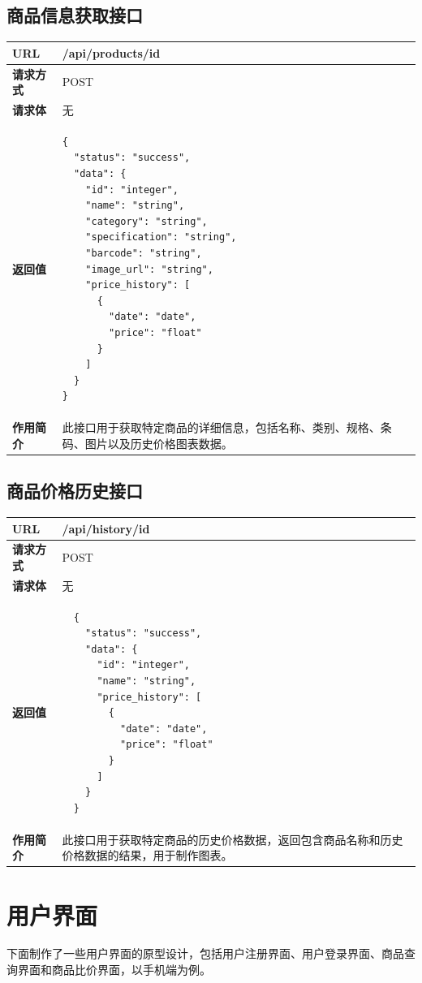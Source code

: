 \documentclass[12pt]{article}
\begin{document}
\subsection{商品信息获取接口}
\begin{longtable}{|p{3cm}|p{10cm}|}
\hline
\textbf{URL} & /api/products/{id} \\ \hline
\textbf{请求方式} & POST \\ \hline
\textbf{请求体} & 无 \\ \hline
\textbf{返回值} &
\begin{verbatim}
{
  "status": "success",
  "data": {
    "id": "integer",
    "name": "string",
    "category": "string",
    "specification": "string",
    "barcode": "string",
    "image_url": "string",
    "price_history": [
      {
        "date": "date",
        "price": "float"
      }
    ]
  }
}
\end{verbatim} \\ \hline
\textbf{作用简介} & 此接口用于获取特定商品的详细信息，包括名称、类别、规格、条码、图片以及历史价格图表数据。 \\ \hline
\end{longtable}

\subsection{商品价格历史接口}
\begin{longtable}{|p{3cm}|p{10cm}|}
  \hline
  \textbf{URL} & /api/history/{id} \\ \hline
  \textbf{请求方式} & POST \\ \hline
  \textbf{请求体} & 无 \\ \hline
  \textbf{返回值} &
  \begin{verbatim}
  {
    "status": "success",
    "data": {
      "id": "integer",
      "name": "string",
      "price_history": [
        {
          "date": "date",
          "price": "float"
        }
      ]
    }
  }
  \end{verbatim} \\ \hline
  \textbf{作用简介} & 此接口用于获取特定商品的历史价格数据，返回包含商品名称和历史价格数据的结果，用于制作图表。 \\ \hline
  \end{longtable}

\section{用户界面}
下面制作了一些用户界面的原型设计，包括用户注册界面、用户登录界面、商品查询界面和商品比价界面，以手机端为例。
\end{document}
